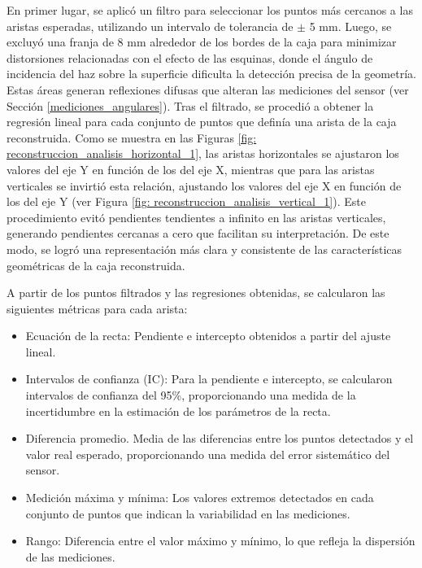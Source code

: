 En primer lugar, se aplicó un filtro para seleccionar los puntos más cercanos a las aristas esperadas, utilizando un intervalo de tolerancia de $\pm$ 5 mm.  Luego, se excluyó una franja de 8 mm alrededor de los bordes de la caja para minimizar distorsiones relacionadas con el efecto de las esquinas, donde el ángulo de incidencia del haz sobre la superficie dificulta la detección precisa de la geometría. Estas áreas generan reflexiones difusas que alteran las mediciones del sensor (ver Sección \ref{mediciones_angulares}).  Tras el filtrado, se procedió a obtener la regresión lineal para cada conjunto de puntos que definía una arista de la caja reconstruida. Como se muestra en las Figuras \ref{fig: reconstruccion_analisis_horizontal_1}, las aristas horizontales se ajustaron los valores del eje Y en función de los del eje X, mientras que para las aristas verticales se invirtió esta relación, ajustando los valores del eje X en función de los del eje Y (ver Figura \ref{fig: reconstruccion_analisis_vertical_1}). Este procedimiento evitó pendientes tendientes a infinito en las aristas verticales, generando pendientes cercanas a cero que facilitan su interpretación. De este modo, se logró una representación más clara y consistente de las características geométricas de la caja reconstruida.

A partir de los puntos filtrados y las regresiones obtenidas, se calcularon las siguientes métricas para cada arista:
\begin{itemize}
	\item Ecuación de la recta: Pendiente e intercepto obtenidos a partir del ajuste lineal.
	\item Intervalos de confianza (IC): Para la pendiente e intercepto, se calcularon intervalos de confianza del 95\%, proporcionando una medida de la incertidumbre en la estimación de los parámetros de la recta.
	\item Diferencia promedio. Media de las diferencias entre los puntos detectados y el valor real esperado, proporcionando una medida del error sistemático del sensor.
	\item Medición máxima y mínima: Los valores extremos detectados en cada conjunto de puntos que indican la variabilidad en las mediciones.
	\item Rango: Diferencia entre el valor máximo y mínimo, lo que refleja la dispersión de las mediciones.
\end{itemize}

